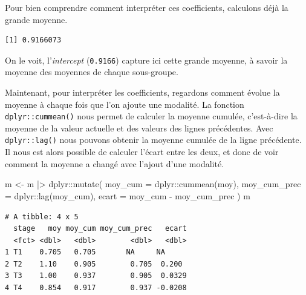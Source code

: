 \documentclass[
  letterpaper,
  DIV=11,
  numbers=noendperiod,
  oneside]{scrreprt}
\newenvironment{Shaded}{\begin{snugshade}}{\end{snugshade}}
\newcommand{\AttributeTok}[1]{\textcolor[rgb]{0.40,0.45,0.13}{#1}}
\newcommand{\ConstantTok}[1]{\textcolor[rgb]{0.56,0.35,0.01}{#1}}
\newcommand{\FunctionTok}[1]{\textcolor[rgb]{0.28,0.35,0.67}{#1}}
\newcommand{\NormalTok}[1]{\textcolor[rgb]{0.00,0.23,0.31}{#1}}
\newcommand{\OtherTok}[1]{\textcolor[rgb]{0.00,0.23,0.31}{#1}}
\newcommand{\SpecialCharTok}[1]{\textcolor[rgb]{0.37,0.37,0.37}{#1}}
\begin{document}
Pour bien comprendre comment interpréter ces coefficients, calculons
déjà la grande moyenne.

\begin{Shaded}
\end{Shaded}

\begin{verbatim}
[1] 0.9166073
\end{verbatim}

On le voit, l'\emph{intercept} (\texttt{0.9166}) capture ici cette
grande moyenne, à savoir la moyenne des moyennes de chaque sous-groupe.

Maintenant, pour interpréter les coefficients, regardons comment évolue
la moyenne à chaque fois que l'on ajoute une modalité. La fonction
\texttt{dplyr::cummean()} nous permet de calculer la moyenne cumulée,
c'est-à-dire la moyenne de la valeur actuelle et des valeurs des lignes
précédentes. Avec \texttt{dplyr::lag()} nous pouvons obtenir la moyenne
cumulée de la ligne précédente. Il nous est alors possible de calculer
l'écart entre les deux, et donc de voir comment la moyenne a changé avec
l'ajout d'une modalité.

\begin{Shaded}
\begin{Highlighting}[]
\NormalTok{m }\OtherTok{\textless{}{-}}\NormalTok{ m }\SpecialCharTok{|\textgreater{}} 
\NormalTok{  dplyr}\SpecialCharTok{::}\FunctionTok{mutate}\NormalTok{(}
    \AttributeTok{moy\_cum =}\NormalTok{ dplyr}\SpecialCharTok{::}\FunctionTok{cummean}\NormalTok{(moy),}
    \AttributeTok{moy\_cum\_prec =}\NormalTok{ dplyr}\SpecialCharTok{::}\FunctionTok{lag}\NormalTok{(moy\_cum),}
    \AttributeTok{ecart =}\NormalTok{ moy\_cum }\SpecialCharTok{{-}}\NormalTok{ moy\_cum\_prec}
\NormalTok{  )}
\NormalTok{m}
\end{Highlighting}
\end{Shaded}

\begin{verbatim}
# A tibble: 4 x 5
  stage   moy moy_cum moy_cum_prec   ecart
  <fct> <dbl>   <dbl>        <dbl>   <dbl>
1 T1    0.705   0.705       NA     NA     
2 T2    1.10    0.905        0.705  0.200 
3 T3    1.00    0.937        0.905  0.0329
4 T4    0.854   0.917        0.937 -0.0208
\end{verbatim}
\end{document}

